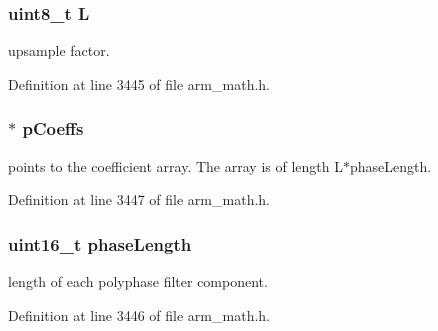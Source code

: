 \subsubsection[{\texorpdfstring{L}{L}}]{\setlength{\rightskip}{0pt plus 5cm}uint8\+\_\+t L}\hypertarget{structarm__fir__interpolate__instance__q31_aee73cc056696e504430c53eaa9c58cf0}{}\label{structarm__fir__interpolate__instance__q31_aee73cc056696e504430c53eaa9c58cf0}
upsample factor. 

Definition at line 3445 of file arm\+\_\+math.\+h.

\subsubsection[{\texorpdfstring{p\+Coeffs}{pCoeffs}}]{$\ast$ p\+Coeffs}\hypertarget{structarm__fir__interpolate__instance__q31_a68888e36167d81cb7836db10367a1682}{}\label{structarm__fir__interpolate__instance__q31_a68888e36167d81cb7836db10367a1682}
points to the coefficient array. The array is of length L$\ast$phase\+Length. 

Definition at line 3447 of file arm\+\_\+math.\+h.

\subsubsection[{\texorpdfstring{phase\+Length}{phaseLength}}]{\setlength{\rightskip}{0pt plus 5cm}uint16\+\_\+t phase\+Length}\hypertarget{structarm__fir__interpolate__instance__q31_a8f92bb07e0812f94679438cdf412b26a}{}\label{structarm__fir__interpolate__instance__q31_a8f92bb07e0812f94679438cdf412b26a}
length of each polyphase filter component. 

Definition at line 3446 of file arm\+\_\+math.\+h.

